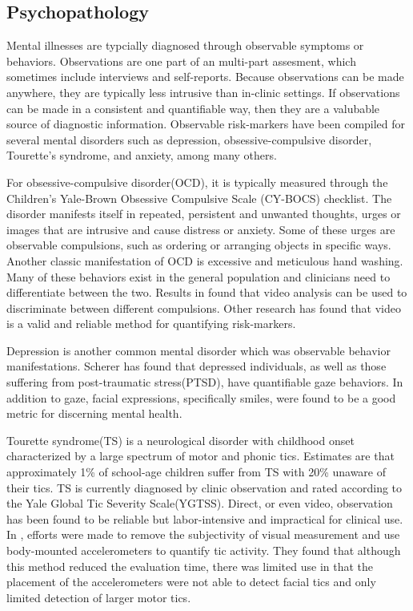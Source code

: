 \documentclass[11pt]{article}
\newcounter{list}
\begin{document}
\subsection{Psychopathology}
Mental illnesses are typcially diagnosed through observable symptoms or behaviors. Observations are one part of an multi-part assesment, which sometimes include interviews and self-reports. Because observations can be made anywhere, they are typically less intrusive than in-clinic settings. If observations can be made in a consistent and quantifiable way, then they are a valubable source of diagnostic information. Observable risk-markers have been compiled for several mental disorders such as depression, obsessive-compulsive disorder, Tourette's syndrome, and anxiety, among many others.

For obsessive-compulsive disorder(OCD), it is typically measured through the Children’s Yale-Brown Obsessive Compulsive Scale (CY-BOCS) checklist. The disorder manifests itself in repeated, persistent and unwanted thoughts, urges or images that are intrusive and cause distress or anxiety. Some of these urges are observable compulsions, such as ordering or arranging objects in specific ways\cite{radomsky2004}. Another classic manifestation of OCD is excessive and meticulous hand washing. Many of these behaviors exist in the general population and clinicians need to differentiate between the two.  Results in \cite{zor2011} found that  video analysis can be used to discriminate between different compulsions. Other research\cite{bernstein2017} has found that video is a valid and reliable method for quantifying risk-markers.

Depression is another common mental disorder which was observable behavior manifestations. Scherer\cite{scherer2014} has found that depressed individuals, as well as those suffering from post-traumatic stress(PTSD), have quantifiable gaze behaviors. In addition to gaze, facial expressions, specifically smiles, were found to be a good metric for discerning mental health.

Tourette syndrome(TS) is a neurological disorder with childhood onset characterized by a large spectrum of motor and phonic tics. Estimates are that approximately 1\% of school-age children suffer from TS with 20\% unaware of their tics. TS is currently diagnosed by clinic observation and rated according to the Yale Global Tic Severity Scale(YGTSS). Direct, or even video, observation has been found to be reliable\cite{walkup1992} but labor-intensive and impractical for clinical use. In \cite{bernabei2010}, efforts were made to remove the subjectivity of visual measurement and use  body-mounted accelerometers to quantify tic activity. They found that although this method reduced the evaluation time, there was limited use in that the placement of the accelerometers were not able to detect facial tics and only limited detection of larger motor tics.
\end{document}
